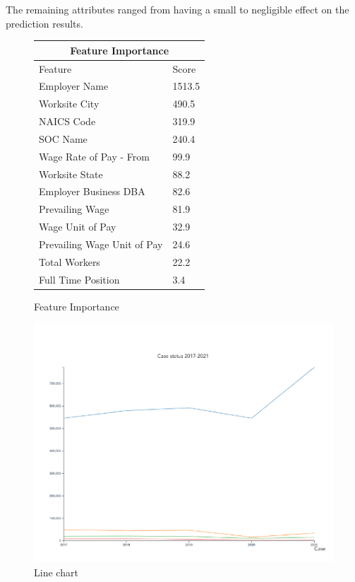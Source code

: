 \documentclass[sigconf]{acmart}
\begin{document}
The remaining attributes ranged from having a small to negligible effect on the prediction results. 


\begin{figure}
  \begin{tabular}{ |p{4cm}||p{2cm}|  }
    \hline
    \multicolumn{2}{|c|}{\textbf{Feature Importance}} \\
    \hline
    Feature & Score\\
    \hline
    Employer Name & 1513.5\\
    Worksite City & 490.5\\
    NAICS Code & 319.9\\
    SOC Name & 240.4\\
    Wage Rate of Pay - From & 99.9\\
    Worksite State & 88.2\\
    Employer Business DBA & 82.6\\
    Prevailing Wage & 81.9\\
    Wage Unit of Pay & 32.9\\
    Prevailing Wage Unit of Pay & 24.6\\
    Total Workers & 22.2\\
    Full Time Position & 3.4\\
    \hline
   \end{tabular}
  \caption{Feature Importance}
   \label{fig:featureimportance}
\end{figure}




\begin{figure}
  \includegraphics[width=\linewidth]{fig2.png}
  \caption{Line chart}
  \label{fig:linechart}
\end{figure}
\end{document}
